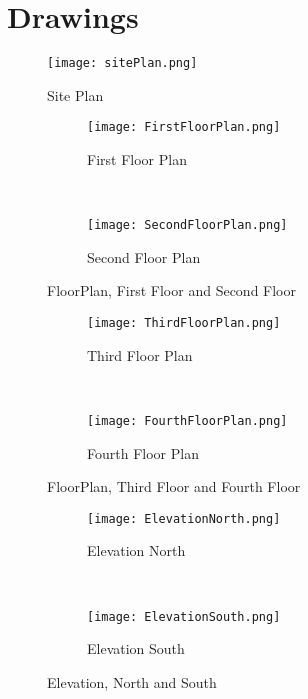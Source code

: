 
\chapter{Drawings} %

\label{Chapter4} %


\begin{figure}[htbp]
	\centering
		\texttt{[image: sitePlan.png]}
	\caption[Site Plan]{Site Plan}
	\label{fig:sitePlan}
\end{figure}

\begin{figure}
\centering
\begin{subfigure}{0.5\textwidth}
  \centering
  \texttt{[image: FirstFloorPlan.png]}
  \caption{First Floor Plan}
  \label{fig:FirstFloorPlan}
\end{subfigure}%
~
\begin{subfigure}{0.5\textwidth}
  \centering
  \texttt{[image: SecondFloorPlan.png]}
  \caption{Second Floor Plan}
  \label{fig:SecondFloorPlan}
\end{subfigure}
\caption{FloorPlan, First Floor and Second Floor}
\label{fig:FloorPlan-Level1-2}
\end{figure}

\begin{figure}
\centering
\begin{subfigure}{0.5\textwidth}
  \centering
  \texttt{[image: ThirdFloorPlan.png]}
  \caption{Third Floor Plan}
  \label{fig:ThirdFloorPlan}
\end{subfigure}%
~
\begin{subfigure}{0.5\textwidth}
  \centering
  \texttt{[image: FourthFloorPlan.png]}
  \caption{Fourth Floor Plan}
  \label{fig:FourthFloorPlan}
\end{subfigure}
\caption{FloorPlan, Third Floor and Fourth Floor}
\label{fig:FloorPlan-Level3-4}
\end{figure}

\begin{figure}[t!]
\centering
\begin{subfigure}{0.5\textwidth}
  \centering
  \texttt{[image: ElevationNorth.png]}
  \caption{Elevation North}
  \label{fig:ElevationNorth}
\end{subfigure}%
~
\begin{subfigure}{0.5\textwidth}
  \centering
  \texttt{[image: ElevationSouth.png]}
  \caption{Elevation South}
  \label{fig:ElevationSouth}
\end{subfigure}
\caption{Elevation, North and South}
\label{fig:ElevationNS}
\end{figure}


